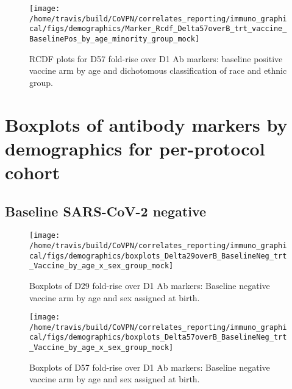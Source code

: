 \documentclass[]{book}
\theoremstyle{definition}
\theoremstyle{definition}
\theoremstyle{definition}
\newcommand{\1}{\mathbbm{1}}
\begin{document}
\begin{figure}[H]

{\centering \texttt{[image: /home/travis/build/CoVPN/correlates\_reporting/immuno\_graphical/figs/demographics/Marker\_Rcdf\_Delta57overB\_trt\_vaccine\_BaselinePos\_by\_age\_minority\_group\_mock]} 

}

\caption{RCDF plots for D57 fold-rise over D1 Ab markers: baseline positive vaccine arm by age and dichotomous classification of race and ethnic group.}\label{fig:unnamed-chunk-127}
\end{figure}

\hypertarget{boxplots-of-antibody-markers-by-demographics-for-per-protocol-cohort}{%
\section{Boxplots of antibody markers by demographics for per-protocol cohort}\label{boxplots-of-antibody-markers-by-demographics-for-per-protocol-cohort}}

\hypertarget{baseline-sars-cov-2-negative-5}{%
\subsection{Baseline SARS-CoV-2 negative}\label{baseline-sars-cov-2-negative-5}}

\begin{figure}[H]

{\centering \texttt{[image: /home/travis/build/CoVPN/correlates\_reporting/immuno\_graphical/figs/demographics/boxplots\_Delta29overB\_BaselineNeg\_trt\_Vaccine\_by\_age\_x\_sex\_group\_mock]} 

}

\caption{Boxplots of D29 fold-rise over D1 Ab markers: Baseline negative vaccine arm by age and sex assigned at birth.}\label{fig:unnamed-chunk-146}
\end{figure}

\begin{figure}[H]

{\centering \texttt{[image: /home/travis/build/CoVPN/correlates\_reporting/immuno\_graphical/figs/demographics/boxplots\_Delta57overB\_BaselineNeg\_trt\_Vaccine\_by\_age\_x\_sex\_group\_mock]} 

}

\caption{Boxplots of D57 fold-rise over D1 Ab markers: Baseline negative vaccine arm by age and sex assigned at birth.}\label{fig:unnamed-chunk-147}
\end{figure}
\end{document}
